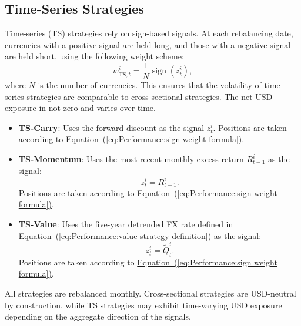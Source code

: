 \documentclass[12pt,oneside,letter]{article}
\newcommand*{\myeq}[1]{\hyperref[{#1}]{Equation~(\ref*{#1})}}
\begin{document}
\begin{appendices}
		\subsection*{Time-Series Strategies}
		Time-series (TS) strategies rely on sign-based signals. At each rebalancing date, currencies with a positive signal are held long, and those with a negative signal are held short, using the following weight scheme:
		\begin{equation}
			w_{\text{TS},t}^{i} = \frac{1}{N} \operatorname{sign}(z_t^i),
			\label{eq:Performance:sign weight formula}
		\end{equation}
		where \( N \) is the number of currencies. This ensures that the volatility of time-series strategies are comparable to cross-sectional strategies. The net USD exposure in not zero and varies over time.
		\begin{itemize}
			\item \textbf{TS-Carry}: Uses the forward discount as the signal \( z_t^i \). Positions are taken according to \myeq{eq:Performance:sign weight formula}.
			\item \textbf{TS-Momentum}: Uses the most recent monthly excess return \( R_{t-1}^i \) as the signal:
			\[
			z_t^i = R_{t-1}^i.
			\]
			Positions are taken according to \myeq{eq:Performance:sign weight formula}.
			\item \textbf{TS-Value}: Uses the five-year detrended FX rate defined in \myeq{eq:Performance:value strategy definition} as the signal:
			\[
			z_t^i = \widetilde{Q}_t^i.
			\]
			Positions are taken according to \myeq{eq:Performance:sign weight formula}.
		\end{itemize}
		All strategies are rebalanced monthly. Cross-sectional strategies are USD-neutral by construction, while TS strategies may exhibit time-varying USD exposure depending on the aggregate direction of the signals.

\end{appendices}
\end{document}
